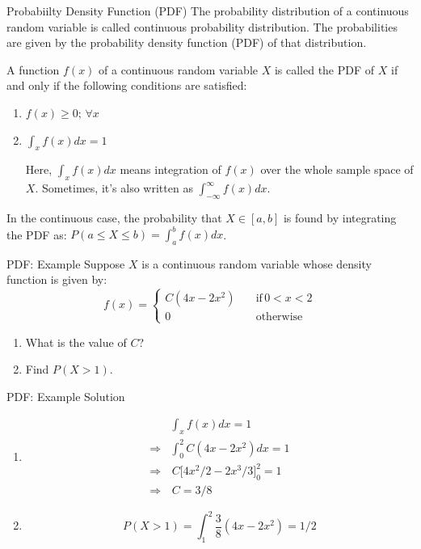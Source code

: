 \documentclass[12pt, aspectratio=169]{beamer}
\begin{document}
	\begin{frame}{Probabiilty Density Function (PDF)}
		The probability distribution of a continuous random variable is called continuous probability distribution. The probabilities are given by the probability density function (PDF) of that distribution.

		\vspace{0.5em}

		A function $f(x)$ of a continuous random variable $X$ is called the PDF of $X$ if and only if the following conditions are satisfied:
		\begin{enumerate}
			\item $f(x) \geqslant 0; \, \forall x$
			\item $\int_x f(x) dx = 1$
			
				\vspace{1em}
			
				Here, $\int_x f(x) dx$ means integration of $f(x)$ over the whole sample space of $X$. Sometimes, it's also written as $\int_{-\infty}^{\infty} f(x) dx$.
		\end{enumerate}

		\vspace{1em}

		In the continuous case, the probability that \(X \in [a, b]\) is found by integrating the PDF as: \(P(a \leqslant X \leqslant b) = \int_a^b f(x) dx\).
	\end{frame}


	\begin{frame}{PDF: Example}
		Suppose $X$ is a continuous random variable whose density function is given by:
		\[
			f(x) = \begin{cases}
					C(4x - 2x^2) \quad & \text{if}\, 0 < x < 2 \\
					0 & \text{otherwise}
				\end{cases}
		\]
		\begin{enumerate}
			\item What is the value of $C$?
			\item Find $P(X>1)$.
		\end{enumerate}
	\end{frame}


	\begin{frame}{PDF: Example Solution}
		\begin{enumerate}
			\item \begin{align*}
				& \int_x f(x) dx = 1 \\
				\Rightarrow & \int_0^2 C(4x - 2x^2) dx = 1 \\
				\Rightarrow &\,  C\big[4x^2/2 - 2x^3/3\big]_0^2 = 1 \\
				\Rightarrow &\, C = 3/8
			\end{align*}

			\item \[
				P(X>1) = \int_1^2 \frac{3}{8} (4x - 2x^2) = 1/2
			\]
		\end{enumerate}
	\end{frame}
\end{document}
